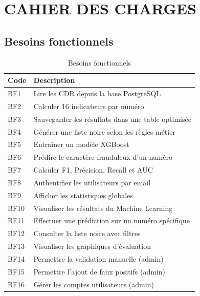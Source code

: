 \documentclass[12pt, oneside, a4paper]{report}
\begin{document}
\section{CAHIER DES CHARGES}

\subsection{Besoins fonctionnels}
\begin{table}[H]
\centering
\caption{Besoins fonctionnels}
\label{tab:bf}
\vspace{0.5cm}
\renewcommand{\arraystretch}{1.3}
\begin{tabular}{|l|p{10cm}|}
\hline
\textbf{Code} & \textbf{Description} \\
\hline
BF1 & Lire les CDR depuis la base PostgreSQL \\
\hline
BF2 & Calculer 16 indicateurs par numéro \\
\hline
BF3 & Sauvegarder les résultats dans une table optimisée \\
\hline
BF4 & Générer une liste noire selon les règles métier \\
\hline
BF5 & Entraîner un modèle XGBoost \\
\hline
BF6 & Prédire le caractère frauduleux d'un numéro \\
\hline
BF7 & Calculer F1, Précision, Recall et AUC \\
\hline
BF8 & Authentifier les utilisateurs par email \\
\hline
BF9 & Afficher les statistiques globales \\
\hline
BF10 & Visualiser les résultats du Machine Learning \\
\hline
BF11 & Effectuer une prédiction sur un numéro spécifique \\
\hline
BF12 & Consulter la liste noire avec filtres \\
\hline
BF13 & Visualiser les graphiques d'évaluation \\
\hline
BF14 & Permettre la validation manuelle (admin) \\
\hline
BF15 & Permettre l'ajout de faux positifs (admin) \\
\hline
BF16 & Gérer les comptes utilisateurs (admin) \\
\hline
\end{tabular}
\end{table}
\end{document}
